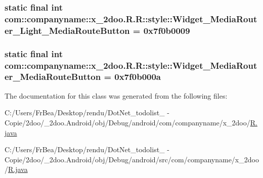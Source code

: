 \hypertarget{classcom_1_1companyname_1_1x__2doo_1_1_r_1_1style_779d4fe75fc93738b23fc7c8cbd79302}{
\subsubsection[{Widget\_\-MediaRouter\_\-Light\_\-MediaRouteButton}]{\setlength{\rightskip}{0pt plus 5cm}static final int com::companyname::x\_\-2doo.R.R::style::Widget\_\-MediaRouter\_\-Light\_\-MediaRouteButton = 0x7f0b0009}}
\label{classcom_1_1companyname_1_1x__2doo_1_1_r_1_1style_779d4fe75fc93738b23fc7c8cbd79302}


\hypertarget{classcom_1_1companyname_1_1x__2doo_1_1_r_1_1style_6fa6b554baba93fa8792da6abbf246c5}{
\subsubsection[{Widget\_\-MediaRouter\_\-MediaRouteButton}]{\setlength{\rightskip}{0pt plus 5cm}static final int com::companyname::x\_\-2doo.R.R::style::Widget\_\-MediaRouter\_\-MediaRouteButton = 0x7f0b000a}}
\label{classcom_1_1companyname_1_1x__2doo_1_1_r_1_1style_6fa6b554baba93fa8792da6abbf246c5}




The documentation for this class was generated from the following files:\begin{CompactItemize}
\item 
C:/Users/FrBea/Desktop/rendu/DotNet\_\-todolist\_ - Copie/2doo/\_\-2doo.Android/obj/Debug/android/com/companyname/x\_\-2doo/\hyperlink{com_2companyname_2x__2doo_2_r_8java}{R.java}\item 
C:/Users/FrBea/Desktop/rendu/DotNet\_\-todolist\_ - Copie/2doo/\_\-2doo.Android/obj/Debug/android/src/com/companyname/x\_\-2doo/\hyperlink{src_2com_2companyname_2x__2doo_2_r_8java}{R.java}\end{CompactItemize}
